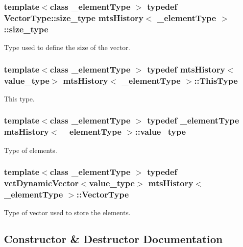 \subsubsection[{size\+\_\+type}]{\setlength{\rightskip}{0pt plus 5cm}template$<$class \+\_\+element\+Type $>$ typedef Vector\+Type\+::size\+\_\+type {\bf mts\+History}$<$ \+\_\+element\+Type $>$\+::{\bf size\+\_\+type}}\label{classmts_history_aca985b1dbd39cc61816674edc9aee0cc}
Type used to define the size of the vector. \hypertarget{classmts_history_aacbd58dfe7cfbae30858ab99557ee181}{}
\subsubsection[{This\+Type}]{\setlength{\rightskip}{0pt plus 5cm}template$<$class \+\_\+element\+Type $>$ typedef {\bf mts\+History}$<${\bf value\+\_\+type}$>$ {\bf mts\+History}$<$ \+\_\+element\+Type $>$\+::{\bf This\+Type}}\label{classmts_history_aacbd58dfe7cfbae30858ab99557ee181}
This type. \hypertarget{classmts_history_a83c4704404e2b71933b53c184bf72e8f}{}
\subsubsection[{value\+\_\+type}]{\setlength{\rightskip}{0pt plus 5cm}template$<$class \+\_\+element\+Type $>$ typedef \+\_\+element\+Type {\bf mts\+History}$<$ \+\_\+element\+Type $>$\+::{\bf value\+\_\+type}}\label{classmts_history_a83c4704404e2b71933b53c184bf72e8f}
Type of elements. \hypertarget{classmts_history_a7ccb818e85025368eb6ccdb5423453a3}{}
\subsubsection[{Vector\+Type}]{\setlength{\rightskip}{0pt plus 5cm}template$<$class \+\_\+element\+Type $>$ typedef {\bf vct\+Dynamic\+Vector}$<${\bf value\+\_\+type}$>$ {\bf mts\+History}$<$ \+\_\+element\+Type $>$\+::{\bf Vector\+Type}}\label{classmts_history_a7ccb818e85025368eb6ccdb5423453a3}
Type of vector used to store the elements. 

\subsection{Constructor \& Destructor Documentation}
\hypertarget{classmts_history_ad99222e10e0961b5938b4ecbc2a77d4a}{}
